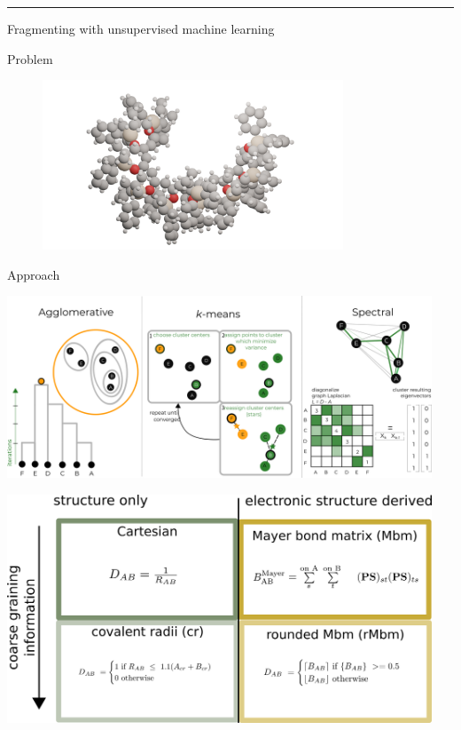 \documentclass[
  letterpaper,
  DIV=11,
  numbers=noendperiod]{scrartcl}
\begin{document}
\begin{center}\rule{0.5\linewidth}{0.5pt}\end{center}

\leavevmode{}%
Fragmenting with unsupervised machine learning

Problem

\begin{figure}

{\centering \includegraphics[width=0.8\textwidth,height=\textheight]{images/large_polymer_example.png}

}

\end{figure}

Approach

\includegraphics[width=0.95\textwidth,height=\textheight]{images/methods.png}

\includegraphics[width=0.95\textwidth,height=\textheight]{images/descriptors.png}
\end{document}
